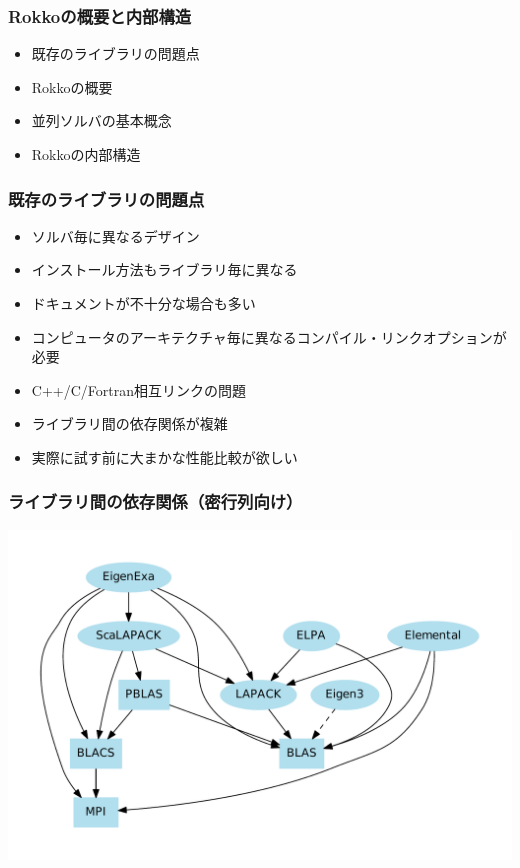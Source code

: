 \begin{frame}
  \frametitle{Rokkoの概要と内部構造}
  \begin{itemize}
    \setlength{\itemsep}{1em}
  \item 既存のライブラリの問題点
  \item Rokkoの概要
  \item 並列ソルバの基本概念
  \item Rokkoの内部構造
  \end{itemize}
\end{frame}

\begin{frame}
  \frametitle{既存のライブラリの問題点}
  \begin{itemize}
    \setlength{\itemsep}{1em}
  \item ソルバ毎に異なるデザイン
  \item インストール方法もライブラリ毎に異なる
  \item ドキュメントが不十分な場合も多い
  \item コンピュータのアーキテクチャ毎に異なるコンパイル・リンクオプションが必要
  \item C++/C/Fortran相互リンクの問題
  \item ライブラリ間の依存関係が複雑
  \item 実際に試す前に大まかな性能比較が欲しい
  \end{itemize}
\end{frame}

\begin{frame}
  \frametitle{ライブラリ間の依存関係（密行列向け）}
  \begin{center}
    \includegraphics[height=0.8\textheight]{figure/eigensolver_dependency.pdf}
  \end{center}
\end{frame}

